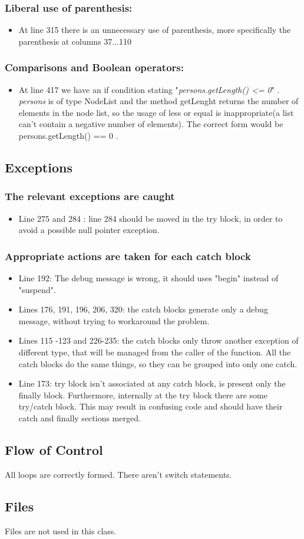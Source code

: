 \subsubsection{Liberal use of parenthesis:}
\begin{itemize}
\item At line 315 there is an unnecessary use of parenthesis, more specifically the parenthesis at columns 37...110  
\end{itemize}
\subsubsection{Comparisons and Boolean operators:}
\begin{itemize}
\item At line 417 we have an if condition stating  "\textit{persons.getLength() <= 0}" . \textit{persons} is of type NodeList and the method getLenght returns the number of elements in the node list, so the usage of less or equal is inappropriate(a list can't contain a negative number of elements). The correct form would be  persons.getLength() == 0 . 
\end{itemize}

\subsection{Exceptions}

\subsubsection{The relevant exceptions are caught}
\begin{itemize}
\item Line 275 and 284 : line 284 should be moved in the try block, in order to avoid a possible null pointer exception.
\end{itemize}

\subsubsection{Appropriate actions are taken for each catch block}
\begin{itemize}
\item Line 192: The debug message is wrong, it should uses "begin" instead of "suspend".
\item Lines 176, 191, 196, 206, 320: the catch blocks generate only a debug message, without trying to workaround the problem.
\item Lines 115 -123 and 226-235: the catch blocks only throw another exception of different type, that will be managed from the caller of the function. All the catch blocks do the same things, so they can be grouped into only one catch.
\item Line 173: try block isn't associated at any catch block, is present only the finally block. Furthermore, internally at the try block there are some try/catch block. This may result in confusing code and should have their catch and finally sections merged.
\end{itemize}


\subsection{Flow of Control}
All loops are correctly formed. There aren't switch statements.
\subsection{Files}
Files are not used in this class.